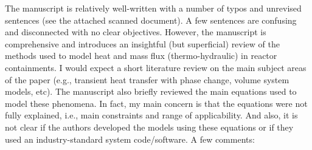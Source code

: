\documentclass[14pt,twoside]{report}
\begin{document}
The manuscript is relatively well-written with a number of typos and unrevised sentences (see the attached scanned document). A few sentences are confusing and disconnected with no clear objectives. However, the manuscript is comprehensive and introduces an insightful (but superficial) review of the methods used to model heat and mass flux (thermo-hydraulic) in reactor containments.  I would expect a short literature review on the main subject areas of the paper (e.g., transient heat transfer with phase change, volume system models, etc). The manuscript also briefly reviewed the main equations used to model these phenomena. In fact, my main concern is that the equations were not fully explained, i.e., main constraints and range of applicability. And also, it is not clear if the authors developed the models using these equations or if they used an industry-standard system code/software. A few comments:
\end{document}
